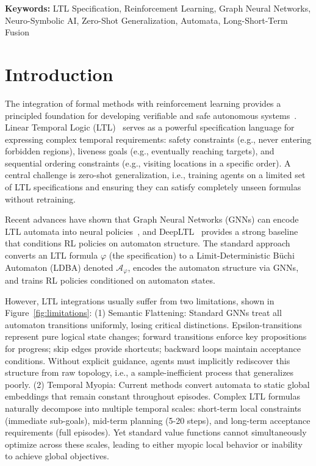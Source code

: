 \documentclass{article}
\begin{document}
\noindent\textbf{Keywords:} LTL Specification, Reinforcement Learning, Graph Neural Networks, Neuro-Symbolic AI, Zero-Shot Generalization, Automata, Long-Short-Term Fusion


\section{Introduction}

The integration of formal methods with reinforcement learning provides a principled foundation for developing verifiable and safe autonomous systems~\citep{Baier2008}. Linear Temporal Logic (LTL)~\citep{Pnueli1977} serves as a powerful specification language for expressing complex temporal requirements: safety constraints (e.g., never entering forbidden regions), liveness goals (e.g., eventually reaching targets), and sequential ordering constraints (e.g., visiting locations in a specific order). A central challenge is zero-shot generalization, i.e., training agents on a limited set of LTL specifications and ensuring they can satisfy completely unseen formulas without retraining.

Recent advances have shown that Graph Neural Networks (GNNs) can encode LTL automata into neural policies~\citep{IcarteRewardMachines2019}, and DeepLTL~\citep{deepltl} provides a strong baseline that conditions RL policies on automaton structure. The standard approach converts an LTL formula $\varphi$ (the specification) to a Limit-Deterministic B\"uchi Automaton (LDBA) denoted $\mathcal{A}_\varphi$, encodes the automaton structure via GNNs, and trains RL policies conditioned on automaton states. 

However, LTL integrations usually suffer from two limitations, shown in Figure~\ref{fig:limitations}: (1) Semantic Flattening: Standard GNNs treat all automaton transitions uniformly, losing critical distinctions. Epsilon-transitions represent pure logical state changes; forward transitions enforce key propositions for progress; skip edges provide shortcuts; backward loops maintain acceptance conditions. Without explicit guidance, agents must implicitly rediscover this structure from raw topology, i.e., a sample-inefficient process that generalizes poorly. (2) Temporal Myopia: Current methods convert automata to static global embeddings that remain constant throughout episodes. Complex LTL formulas naturally decompose into multiple temporal scales: short-term local constraints (immediate sub-goals), mid-term planning (5-20 steps), and long-term acceptance requirements (full episodes). Yet standard value functions cannot simultaneously optimize across these scales, leading to either myopic local behavior or inability to achieve global objectives.
\end{document}
